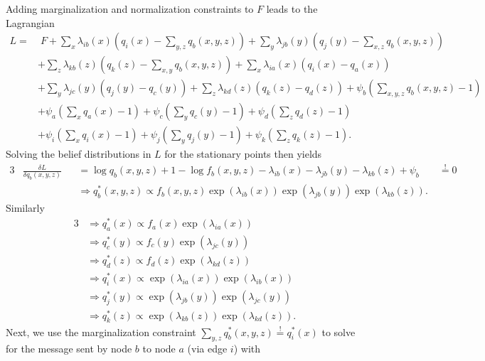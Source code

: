 Adding marginalization and normalization constraints to \(F\) leads to the Lagrangian
\begin{equation}
    \begin{split}
        L = & \; F + \sum_x \lambda_{ib}(x) (q_i(x) - \sum_{y,z} q_b(x,y,z)) + \sum_y \lambda_{jb}(y) (q_j(y) - \sum_{x,z} q_b(x,y,z))     \\
            & + \sum_z \lambda_{kb}(z) (q_k(z) - \sum_{x,y} q_b(x,y,z)) + \sum_x \lambda_{ia}(x) (q_i(x) - q_a(x))                         \\
            & + \sum_y \lambda_{jc}(y) (q_j(y) - q_c(y)) + \sum_z \lambda_{kd}(z) (q_k(z) - q_d(z)) + \psi_b (\sum_{x,y,z} q_b(x,y,z) - 1) \\
            & + \psi_a (\sum_x q_a(x) - 1) + \psi_c (\sum_y q_c(y) - 1) + \psi_d (\sum_z q_d(z) - 1)                                       \\
            & + \psi_i (\sum_x q_i(x) - 1) + \psi_j (\sum_y q_j(y) - 1) + \psi_k (\sum_z q_k(z) - 1).
    \end{split}
\end{equation}
Solving the belief distributions in \(L\) for the stationary points then yields
\begin{alignat}{3}
     & \frac{\delta L}{\delta q_b(x,y,z)} &  & = \log q_b(x,y,z) + 1 - \log f_b(x,y,z) - \lambda_{ib}(x) - \lambda_{jb}(y) - \lambda_{kb}(z) + \psi_b         & \; \overset{!}{=} 0 \\
     &                                    &  & \Rightarrow q_b^*(x,y,z) \propto f_b(x,y,z) \exp(\lambda_{ib}(x)) \exp(\lambda_{jb}(y)) \exp(\lambda_{kb}(z)).
\end{alignat}
Similarly
\begin{alignat}{3}
     & \Rightarrow q_a^*(x) \propto f_a(x) \exp(\lambda_{ia}(x))                 \\
     & \Rightarrow q_c^*(y) \propto f_c(y) \exp(\lambda_{jc}(y))                 \\
     & \Rightarrow q_d^*(z) \propto f_d(z) \exp(\lambda_{kd}(z))                 \\
     & \Rightarrow q_i^*(x) \propto \exp(\lambda_{ia}(x)) \exp(\lambda_{ib}(x))  \\
     & \Rightarrow q_j^*(y) \propto \exp(\lambda_{jb}(y)) \exp(\lambda_{jc}(y))  \\
     & \Rightarrow q_k^*(z) \propto \exp(\lambda_{kb}(z)) \exp(\lambda_{kd}(z)).
\end{alignat}
Next, we use the marginalization constraint \(\sum_{y,z} q_b^*(x,y,z) \overset{!}{=} q_i^*(x)\) to solve for the message sent by node \(b\) to node \(a\) (via edge \(i\)) with
